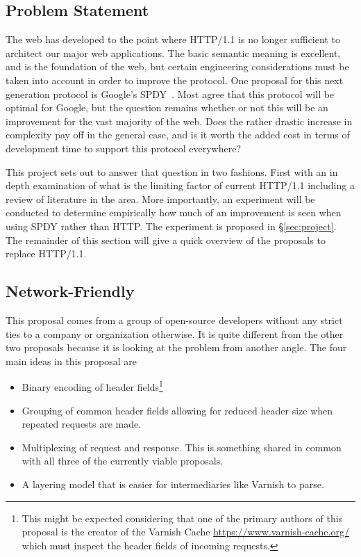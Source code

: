 \documentclass[11pt,letterpaper,notitlepage]{article}
\begin{document}
\subsection{Problem Statement}
\label{sec:intro/problem}
The web has developed to the point where HTTP/1.1 is no longer sufficient to
architect our major web applications. The basic semantic meaning is excellent,
and is the foundation of the web, but certain engineering considerations must be
taken into account in order to improve the protocol.  One proposal for this next
generation protocol is Google's SPDY~\cite{spdyspec}.  Most agree that this protocol will
be optimal for Google, but the question remains whether or not this will be an
improvement for the vast majority of the web.  Does the rather drastic increase
in complexity pay off in the general case, and is it worth the added cost in
terms of development time to support this protocol everywhere?

This project sets out to answer that question in two fashions.  First with an in
depth examination of what is the limiting factor of current HTTP/1.1 including a
review of literature in the area.  More importantly, an experiment will be
conducted to determine empirically how much of an improvement is seen when using
SPDY rather than HTTP.  The experiment is proposed in \S\ref{sec:project}. The
remainder of this section will give a quick overview of the proposals to replace
HTTP/1.1.

\subsection{Network-Friendly}
\label{sec:intro/opensource}
This proposal comes from a group of open-source developers without any strict
ties to a company or organization otherwise.  It is quite different from the
other two proposals because it is looking at the problem from another angle.
The four main ideas in this proposal are~\cite{friendly}
\begin{itemize}
\item Binary encoding of header fields\footnote{This might be expected
considering that one of the primary authors of this proposal is the creator of
the Varnish Cache \url{https://www.varnish-cache.org/} which must inspect the
header fields of incoming requests.}
\item Grouping of common header fields allowing for reduced header size when
repeated requests are made.
\item Multiplexing of request and response.  This is something shared in common
with all three of the currently viable proposals.
\item A layering model that is easier for intermediaries like Varnish to parse. 
\end{itemize}
\end{document}
